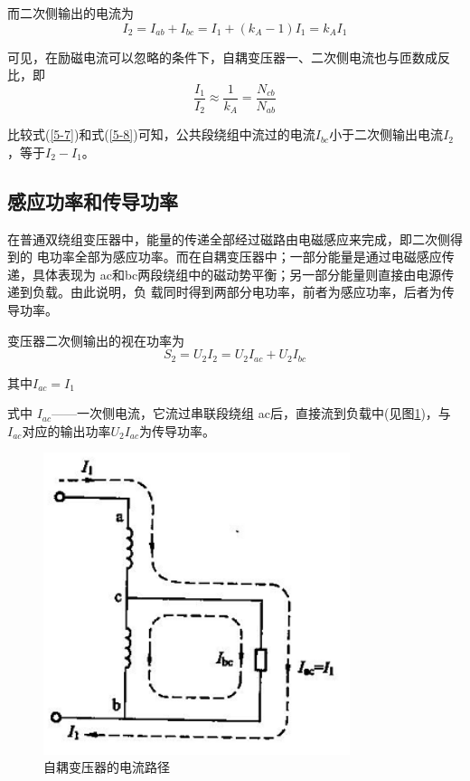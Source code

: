 \documentclass{book}
\begin{document}
而二次侧输出的电流为
\begin{equation}
{{I}_{2}}={{I}_{ab}}+{{I}_{bc}}={{I}_{1}}+\left( {{k}_{A}}-1 \right){{I}_{1}}={{k}_{A}}{{I}_{1}}
\label{5-8}
\end{equation}

可见，在励磁电流可以忽略的条件下，自耦变压器一、二次侧电流也与匝数成反比，即
\begin{equation}
\frac{{{I}_{1}}}{{{I}_{2}}}\approx \frac{1}{{{k}_{A}}}=\frac{{{N}_{cb}}}{{{N}_{ab}}}
\label{5-9}
\end{equation}

比较式(\ref{5-7})和式(\ref{5-8})可知，公共段绕组中流过的电流${{I}_{bc}}$小于二次侧输出电流${{I}_{2}}$，等于${{I}_{2}}-{{I}_{1}}$。

\subsection{感应功率和传导功率}

在普通双绕组变压器中，能量的传递全部经过磁路由电磁感应来完成，即二次侧得到的 电功率全部为感应功率。而在自耦变压器中；一部分能量是通过电磁感应传递，具体表现为 ac和bc两段绕组中的磁动势平衡；另一部分能量则直接由电源传递到负载。由此说明，负 载同时得到两部分电功率，前者为感应功率，后者为传导功率。

变压器二次侧输出的视在功率为
\begin{equation}
{{S}_{2}}={{U}_{2}}{{I}_{2}}={{U}_{2}}{{I}_{ac}}+{{U}_{2}}{{I}_{bc}}
\label{5-10}
\end{equation}

其中${{I}_{ac}}={{I}_{1}}$

式中  ${{I}_{ac}}$——一次侧电流，它流过串联段绕组 ac后，直接流到负载中(见图\ref{fig_5-2})，与${{I}_{ac}}$对应的输出功率${{U}_{2}}{{I}_{ac}}$为传导功率。

\begin{figure}[H]
	\centering
	\includegraphics[width=0.80\textwidth]{5-2.png}
	\caption{自耦变压器的电流路径}
	\label{fig_5-2}
\end{figure}
\end{document}
